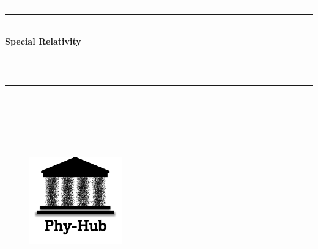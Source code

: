 \rule{\textwidth}{0pt}
\rule{\textwidth}{1pt}
{ \Huge \bf {} \\ \vspace{0.3cm} \hspace*{\fill} Special Relativity \hspace*{\fill}}\\
\rule{\textwidth}{0pt}
\vspace{-1cm}\\
\rule{\textwidth}{1pt}
\vspace{-1.05cm}\\
\rule{\textwidth}{2pt}
\\
\\
\vspace*{8cm}
\begin{figure}[ht]%
\centering
       \includegraphics[width=4cm]{images/png/PhyHub_Logo.png}
\end{figure}

\thispagestyle{empty}
\pagecolor{yellow}
\newpage